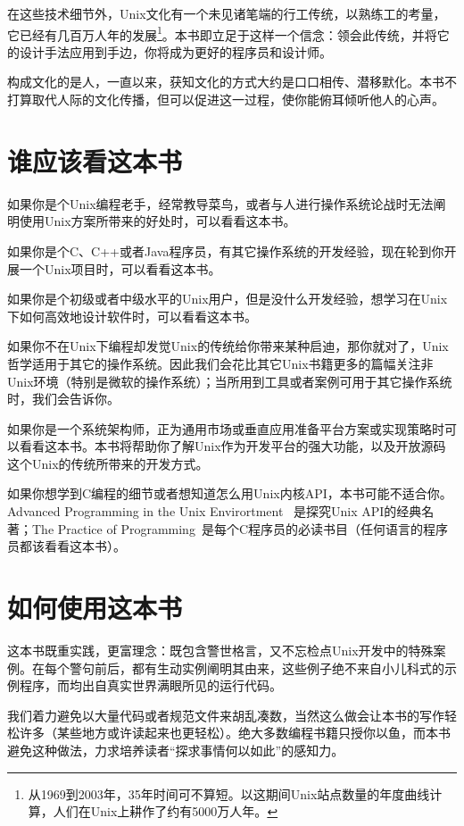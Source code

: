 \documentclass[12pt,oneside]{ctexbook}
\begin{document}
\begin{common-format}
{在这些技术细节外，Unix文化有一个未见诸笔端的行工传统，以熟练工的考量，它已经有几百万人年的发展\footnote{从1969到2003年，35年时间可不算短。以这期间Unix站点数量的年度曲线计算，人们在Unix上耕作了约有5000万人年。}。本书即立足于这样一个信念：领会此传统，并将它的设计手法应用到手边，你将成为更好的程序员和设计师。

构成文化的是人，一直以来，获知文化的方式大约是口口相传、潜移默化。本书不打算取代人际的文化传播，但可以促进这一过程，使你能俯耳倾听他人的心声。


\section{谁应该看这本书}
如果你是个Unix编程老手，经常教导菜鸟，或者与人进行操作系统论战时无法阐明使用Unix方案所带来的好处时，可以看看这本书。

如果你是个C、C++或者Java程序员，有其它操作系统的开发经验，现在轮到你开展一个Unix项目时，可以看看这本书。

如果你是个初级或者中级水平的Unix用户，但是没什么开发经验，想学习在Unix下如何高效地设计软件时，可以看看这本书。

如果你不在Unix下编程却发觉Unix的传统给你带来某种启迪，那你就对了，Unix哲学适用于其它的操作系统。因此我们会花比其它Unix书籍更多的篇幅关注非Unix环境（特别是微软的操作系统）；当所用到工具或者案例可用于其它操作系统时，我们会告诉你。

如果你是一个系统架构师，正为通用市场或垂直应用准备平台方案或实现策略时可以看看这本书。本书将帮助你了解Unix作为开发平台的强大功能，以及开放源码这个Unix的传统所带来的开发方式。

如果你想学到C编程的细节或者想知道怎么用Unix内核API，本书可能不适合你。Advanced Programming in the Unix Envirortment ~\cite{Stevens92}是探究Unix API的经典名著；The Practice of Programming~\cite{Kernighan-Pike99}是每个C程序员的必读书目（任何语言的程序员都该看看这本书）。

\section{如何使用这本书}
这本书既重实践，更富理念：既包含警世格言，又不忘检点Unix开发中的特殊案例。在每个警句前后，都有生动实例阐明其由来，这些例子绝不来自小儿科式的示例程序，而均出自真实世界满眼所见的运行代码。

我们着力避免以大量代码或者规范文件来胡乱凑数，当然这么做会让本书的写作轻松许多（某些地方或许读起来也更轻松）。绝大多数编程书籍只授你以鱼，而本书避免这种做法，力求培养读者“探求事情何以如此”的感知力。

}
\end{common-format}
\end{document}
